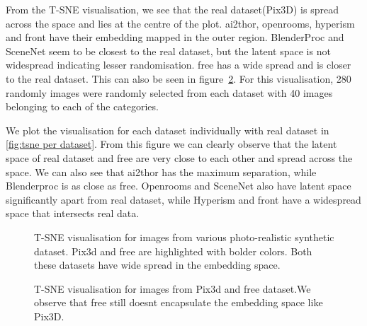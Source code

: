 From the T-SNE visualisation, we see that the real dataset(Pix3D) is spread across the space and lies at the centre of the plot.
\gls{ai2thor}, openrooms, hyperism and \gls{front} have their embedding mapped in the outer region.
BlenderProc and SceneNet seem to be closest to the real dataset, but the latent space is not widespread indicating lesser randomisation.
\gls{free} has a wide spread and is closer to the real dataset.
This can also be seen in figure~\ref{fig:pix3d_s2r3dfree}.
For this visualisation, 280 randomly images were randomly selected from each dataset with 40 images belonging to each of the categories.

We plot the visualisation for each dataset individually with real dataset in \autoref{fig:tsne per dataset}.
From this figure we can clearly observe that the latent space of real dataset and \gls{free} are very close to each other and spread across the space.
We can also see that \gls{ai2thor} has the maximum separation, while Blenderproc is as close as \gls{free}.
Openrooms and SceneNet also have latent space significantly apart from real dataset, while Hyperism and \gls{front} have a widespread space that intersects real data.

\begin{figure}
    \centering
    \resizebox{\textwidth}{10cm}{}
    \caption{T-SNE visualisation for images from various photo-realistic synthetic dataset. Pix3d and \gls{free} are highlighted with bolder colors.
    Both these datasets have wide spread in the embedding space.}
    \label{fig:photorealistic tsne}
\end{figure}

\begin{figure}
    \centering
    \resizebox{\textwidth}{10cm}{}
    \caption{T-SNE visualisation for images from Pix3d and \gls{free} dataset.We observe that \gls{free} still doesnt encapsulate the embedding space like Pix3D.}
    \label{fig:pix3d_s2r3dfree}
\end{figure}

